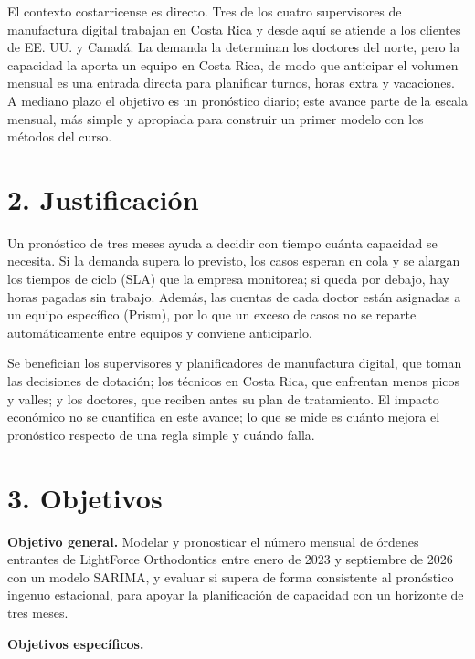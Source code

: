 \documentclass[
  spanish,
  11pt,
]{article}
\begin{document}
El contexto costarricense es directo. Tres de los cuatro supervisores de
manufactura digital trabajan en Costa Rica y desde aquí se atiende a los
clientes de EE. UU. y Canadá. La demanda la determinan los doctores del
norte, pero la capacidad la aporta un equipo en Costa Rica, de modo que
anticipar el volumen mensual es una entrada directa para planificar
turnos, horas extra y vacaciones. A mediano plazo el objetivo es un
pronóstico diario; este avance parte de la escala mensual, más simple y
apropiada para construir un primer modelo con los métodos del curso.

\section{2. Justificación}\label{justificaciuxf3n}

Un pronóstico de tres meses ayuda a decidir con tiempo cuánta capacidad
se necesita. Si la demanda supera lo previsto, los casos esperan en cola
y se alargan los tiempos de ciclo (SLA) que la empresa monitorea; si
queda por debajo, hay horas pagadas sin trabajo. Además, las cuentas de
cada doctor están asignadas a un equipo específico (Prism), por lo que
un exceso de casos no se reparte automáticamente entre equipos y
conviene anticiparlo.

Se benefician los supervisores y planificadores de manufactura digital,
que toman las decisiones de dotación; los técnicos en Costa Rica, que
enfrentan menos picos y valles; y los doctores, que reciben antes su
plan de tratamiento. El impacto económico no se cuantifica en este
avance; lo que se mide es cuánto mejora el pronóstico respecto de una
regla simple y cuándo falla.

\section{3. Objetivos}\label{objetivos}

\textbf{Objetivo general.} Modelar y pronosticar el número mensual de
órdenes entrantes de LightForce Orthodontics entre enero de 2023 y
septiembre de 2026 con un modelo SARIMA, y evaluar si supera de forma
consistente al pronóstico ingenuo estacional, para apoyar la
planificación de capacidad con un horizonte de tres meses.

\textbf{Objetivos específicos.}
\end{document}
